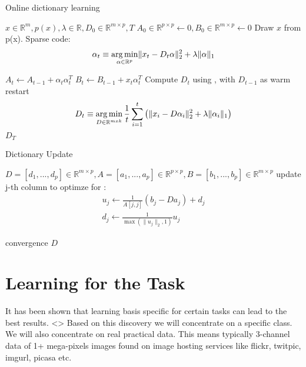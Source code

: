 \begin{algorithm}
\caption{Online dictionary learning \cite{Mairal2010}}
\begin{algorithmic}[1]
\REQUIRE $x \in \mathbb{R}^m,  p \left( x \right), \lambda \in \mathbb{R}, D_0 \in \mathbb{R}^{m \times p}, T$
\STATE $A_0 \in \mathbb{R}^{p \times p} \gets  0, B_0 \in \mathbb{R}^{m \times p}\gets 0$
\STATE Draw $x$ from p(x).
\STATE Sparse code:
\begin{align*} 
\alpha_t \equiv \operatorname*{arg\,min}_{\alpha\in\mathbb{R}^{p}}  \lVert x_t - D_t\alpha \rVert^{2}_{2}  +  \lambda \lVert \alpha \rVert_{1}
\end{align*}

\STATE $A_t \gets A_{t-1} + \alpha_t\alpha_t^T$
\STATE $B_t \gets B_{t-1} + x_t\alpha_t^T$
\STATE Compute $D_t$ using , with $D_{t-1}$ as warm restart 
\begin{align} 
D_t \equiv \operatorname*{arg\,min}_{D \in \mathbb{R}^{m x k}}  \frac{1}{t} \sum_{i=1}^t \left( \lVert x_i - D\alpha_i \rVert^{2}_{2}  +  \lambda \lVert \alpha_i \rVert_{1} \right) \label{eq:update}
\end{align}
\ENDFOR
\RETURN $D_T$
\end{algorithmic}
\end{algorithm}


\begin{algorithm}
\caption{Dictionary Update}
\label{alg:update}
\begin{algorithmic}[1]
\REQUIRE $D=[d_1,...,d_p] \in \mathbb{R}^{m \times p}, A=[a_1,...,a_p] \in \mathbb{R}^{p \times p}, B=[b_1,...,b_p] \in \mathbb{R}^{m \times p}$
\REPEAT
{}
\STATE update j-th column to optimze for :
\begin{align*}
u_j \gets \frac{1}{A[j,j]}\left(b_j-Da_j\right)+d_j \\
d_j \gets \frac{1}{\max\left(\lVert u_j \rVert_2,1\right)} u_j
\end{align*}

\ENDFOR
\UNTIL convergence 
\RETURN $D$
\end{algorithmic}
\end{algorithm}


\section{Learning for the Task}
It has been shown that learning basis specific for certain tasks can lead to the best results\cite{sapiro?}.  <>
Based on this discovery we will concentrate on a specific class. 
We will also concentrate on real practical data. This means typically 3-channel data of 1+ mega-pixels images found on image hosting services like flickr, twitpic, imgurl, picasa etc.


